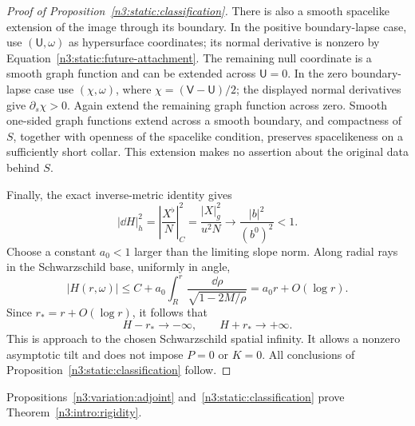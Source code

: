 \begin{proof}[Proof of Proposition~\ref{n3:static:classification}]
There is also a smooth spacelike extension of the image through
its boundary. In the positive boundary-lapse case, use
\((\mathsf U,\omega)\) as hypersurface coordinates; its normal
derivative is nonzero by
Equation~\eqref{n3:static:future-attachment}.
The remaining null coordinate is a smooth graph function and can
be extended across \(\mathsf U=0\).
In the zero boundary-lapse case use
\((\chi,\omega)\), where
\(\chi=(\mathsf V-\mathsf U)/2\); the displayed normal derivatives
give \(\partial_s\chi>0\).
Again extend the remaining graph function across zero.
Smooth one-sided graph functions extend across a smooth boundary,
and compactness of \(S\), together with openness of the spacelike
condition, preserves spacelikeness on a sufficiently short collar.
This extension makes no assertion about the original data behind
\(S\).

Finally, the exact inverse-metric identity gives
\begin{equation}
\label{n3:static:end-slope}
|\dd H|_h^2
=\left|\frac{X^\flat}{N}\right|_C^2
=\frac{|X|_g^2}{u^2N}
\longrightarrow\frac{|b|^2}{(b^0)^2}<1.
\end{equation}
Choose a constant \(a_0<1\) larger than the limiting slope norm.
Along radial rays in the Schwarzschild base, uniformly in angle,
\[
|H(r,\omega)|
\leq C+a_0\int_R^r
\frac{\dd\rho}{\sqrt{1-2M/\rho}}
=a_0r+O(\log r).
\]
Since \(r_*=r+O(\log r)\), it follows that
\[
H-r_*\longrightarrow-\infty,\qquad
H+r_*\longrightarrow+\infty.
\]
This is approach to the chosen Schwarzschild spatial infinity.
It allows a nonzero asymptotic tilt and does not impose \(P=0\)
or \(K=0\).
All conclusions of Proposition~\ref{n3:static:classification} follow.
\end{proof}

Propositions~\ref{n3:variation:adjoint} and~\ref{n3:static:classification}
prove Theorem~\ref{n3:intro:rigidity}.
